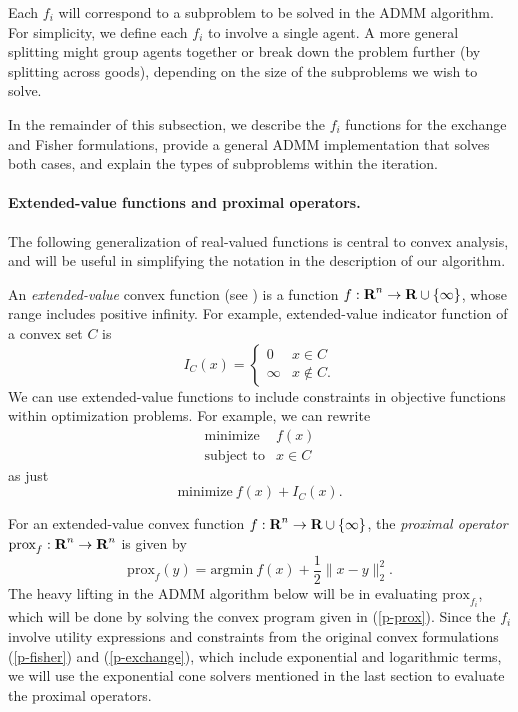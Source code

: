 \documentclass[12pt]{article}
\begin{document}
Each $f_i$ will correspond to a subproblem to be solved in the ADMM algorithm.
For simplicity, we define each $f_i$ to involve a single agent. A more general
splitting might group agents together or break down the problem further (by
splitting across goods), depending on the size of the subproblems we wish to
solve.

In the remainder of this subsection, we describe the $f_i$ functions for the
exchange and Fisher formulations, provide a general ADMM implementation that
solves both cases, and explain the types of subproblems within the iteration.

\paragraph{Extended-value functions and proximal operators.}
The following generalization of real-valued functions is central to convex
analysis, and will be useful in simplifying the notation in the description
of our algorithm.

An \emph{extended-value} convex function (see \cite{BoV:04}) is a function 
$f: {\mbox{\bf R}}^n \to {\mbox{\bf R}} \cup \{\infty\}$, whose range includes
positive infinity. 
For example, extended-value indicator function of a convex set $C$ is
\[
I_C (x) =
\begin{cases}
0 & x \in C\\
\infty & x \not\in C.
\end{cases}
\]
We can use extended-value functions to include constraints in objective
functions within optimization problems. For example, we can rewrite
\begin{equation*}
\begin{array}{ll}
\mbox{minimize} & f(x) \\
\mbox{subject to} & x \in C
\end{array}
\end{equation*}
as just 
\[
\mbox{minimize}\ f(x) + I_C(x).
\]

For an extended-value convex function
$f: {\mbox{\bf R}}^n \to {\mbox{\bf R}} \cup \{\infty\}$,
the \emph{proximal operator} \cite{parikh2013proximal}
$\mbox{prox}_{f} : {\mbox{\bf R}}^n \to {\mbox{\bf R}}^n$
is given by
\begin{equation}
\label{p-prox}
\mbox{prox}_f(y) = \mbox{argmin}\ f(x) + \frac{1}{2}\|x - y\|_2^2.
\end{equation}
The heavy lifting in the ADMM algorithm below
will be in evaluating $\mbox{prox}_{f_i}$, which will be done
by solving the convex program given in (\ref{p-prox}). Since the $f_i$ involve
utility expressions and constraints from the original convex formulations
(\ref{p-fisher}) and (\ref{p-exchange}), which include
exponential and logarithmic terms, we will use the exponential cone solvers
mentioned in the last section to evaluate the proximal operators.
\end{document}
